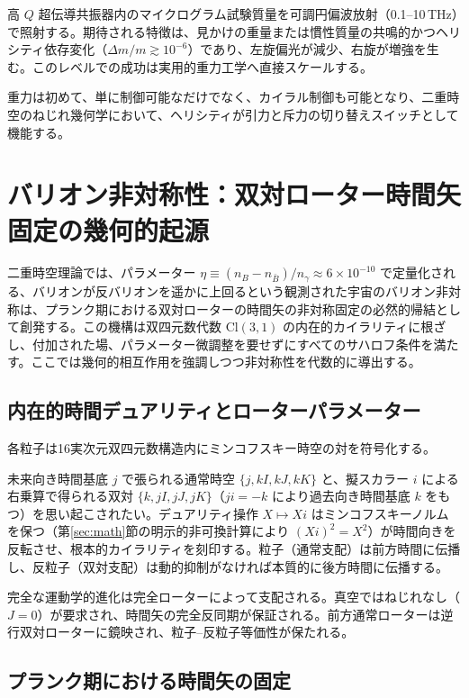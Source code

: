 \documentclass[a4paper]{article}
\begin{document}
高 $Q$ 超伝導共振器内のマイクログラム試験質量を可調円偏波放射（0.1--10\,THz）で照射する。期待される特徴は、見かけの重量または慣性質量の共鳴的かつヘリシティ依存変化（$\Delta m/m \gtrsim 10^{-6}$）であり、左旋偏光が減少、右旋が増強を生む。このレベルでの成功は実用的重力工学へ直接スケールする。

重力は初めて、単に制御可能なだけでなく、カイラル制御も可能となり、二重時空のねじれ幾何学において、ヘリシティが引力と斥力の切り替えスイッチとして機能する。

\section{バリオン非対称性：双対ローター時間矢固定の幾何的起源}
\label{sec:baryonasymmetry}

二重時空理論では、パラメーター $\eta \equiv (n_B - n_{\bar{B}})/n_\gamma \approx 6 \times 10^{-10}$ で定量化される、バリオンが反バリオンを遥かに上回るという観測された宇宙のバリオン非対称は、プランク期における双対ローターの時間矢の非対称固定の必然的帰結として創発する。この機構は双四元数代数 $\mathrm{Cl}(3,1)$ の内在的カイラリティに根ざし、付加された場、パラメーター微調整を要せずにすべてのサハロフ条件を満たす。ここでは幾何的相互作用を強調しつつ非対称性を代数的に導出する。

\subsection{内在的時間デュアリティとローターパラメーター}

各粒子は16実次元双四元数構造内にミンコフスキー時空の対を符号化する。

未来向き時間基底 $j$ で張られる通常時空 $\{j, kI, kJ, kK\}$ と、擬スカラー $i$ による右乗算で得られる双対 $\{k, jI, jJ, jK\}$（$j i = -k$ により過去向き時間基底 $k$ をもつ）を思い起こされたい。デュアリティ操作 $X \mapsto X i$ はミンコフスキーノルムを保つ（第\ref{sec:math}節の明示的非可換計算により $(X i)^2 = X^2$）が時間向きを反転させ、根本的カイラリティを刻印する。粒子（通常支配）は前方時間に伝播し、反粒子（双対支配）は動的抑制がなければ本質的に後方時間に伝播する。

完全な運動学的進化は完全ローターによって支配される。真空ではねじれなし（$J=0$）が要求され、時間矢の完全反同期が保証される。前方通常ローターは逆行双対ローターに鏡映され、粒子--反粒子等価性が保たれる。

\subsection{プランク期における時間矢の固定}
\end{document}
